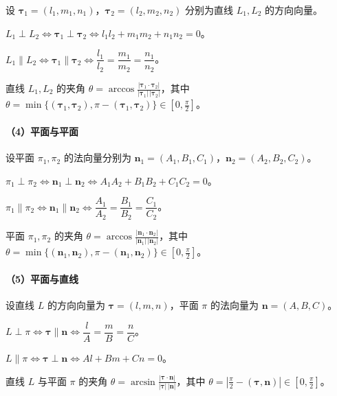 设 $\bm\tau_1=(l_1,m_1,n_1)$，$\bm\tau_2=(l_2,m_2,n_2)$ 分别为直线 $L_1,L_2$ 的方向向量。

 $L_1\perp L_2\Longleftrightarrow\bm\tau_1\perp\bm\tau_2
\Longleftrightarrow l_1l_2+m_1m_2+n_1n_2=0$。

 $L_1\parallel L_2\Longleftrightarrow\bm\tau_1\parallel\bm\tau_2
\Longleftrightarrow\dfrac{l_1}{l_2}=\dfrac{m_1}{m_2}=\dfrac{n_1}{n_2}$。

 直线 $L_1,L_2$ 的夹角
$\displaystyle \theta=\arccos\frac{|\bm\tau_1\cdot\bm\tau_2|}
{|\bm\tau_1|\,|\bm\tau_2|}$，其中
$\theta=\min\{(\bm\tau_1,\bm\tau_2),\pi-(\bm\tau_1,\bm\tau_2)\}
\in[0,\frac{\pi}{2}]$。

\paragraph{（4）平面与平面}

设平面 $\pi_1,\pi_2$ 的法向量分别为 $\bm n_1=(A_1,B_1,C_1)$，$\bm n_2=(A_2,B_2,C_2)$。

 $\pi_1\perp\pi_2\Longleftrightarrow\bm n_1\perp\bm n_2
\Longleftrightarrow A_1A_2+B_1B_2+C_1C_2=0$。

 $\pi_1\parallel\pi_2\Longleftrightarrow\bm n_1\parallel\bm n_2
\Longleftrightarrow\dfrac{A_1}{A_2}=\dfrac{B_1}{B_2}=\dfrac{C_1}{C_2}$。

 平面 $\pi_1,\pi_2$ 的夹角
$\displaystyle \theta=\arccos\frac{|\bm n_1\cdot\bm n_2|}
{|\bm n_1|\,|\bm n_2|}$，其中
$\theta=\min\{(\bm n_1,\bm n_2),\pi-(\bm n_1,\bm n_2)\}
\in[0,\frac{\pi}{2}]$。

\paragraph{（5）平面与直线}

设直线 $L$ 的方向向量为 $\bm\tau=(l,m,n)$，平面 $\pi$ 的法向量为 $\bm n=(A,B,C)$。

 $L\perp\pi\Longleftrightarrow\bm\tau\parallel\bm n
\Longleftrightarrow\dfrac{l}{A}=\dfrac{m}{B}=\dfrac{n}{C}$。

 $L\parallel\pi\Longleftrightarrow\bm\tau\perp\bm n
\Longleftrightarrow Al+Bm+Cn=0$。

 直线 $L$ 与平面 $\pi$ 的夹角
$\displaystyle \theta=\arcsin\frac{|\bm\tau\cdot\bm n|}
{|\bm\tau|\,|\bm n|}$，其中
$\theta=\left|\frac{\pi}{2}-(\bm\tau,\bm n)\right|
\in[0,\frac{\pi}{2}]$。



